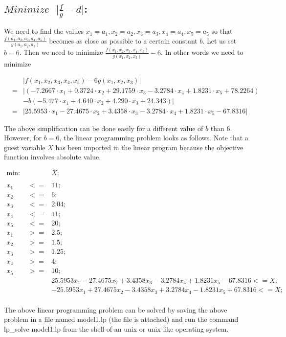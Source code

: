 \documentclass[11pt]{article}
\begin{document}
\subsection{$Minimize \text{ } \vert\frac{f}{g}-d\vert$:} We need to find the values $x_1 = a_1,x_2 = a_2,x_3 = a_3,x_4 = a_4,x_5 = a_5$ so that $\frac{f(a_1,a_2,a_3,a_4,a_5)}{g(a_1,a_2,a_3)}$ becomes as close as possible to a certain constant $b$. Let us set $b=6$. Then we need to minimize $\frac{f(x_1,x_2,x_3,x_4,x_5)}{g(x_1,x_2,x_3)}-6$. In other words we need to minimize 
\begin{tiny}
\begin{eqnarray*}
& & \vert f(x_1,x_2,x_3,x_4,x_5) - 6 g(x_1,x_2,x_3) \vert\\
&=& \vert(-7.2667 \cdot x_1 + 0.3724 \cdot x_2 + 29.1759 \cdot x_3 - 3.2784 \cdot x_4 + 1.8231 \cdot x_5 + 78.2264)\\ 
& & - b(-5.477 \cdot x_1 + 4.640 \cdot x_2 + 4.290 \cdot x_3 + 24.343)\vert \\
&=& \vert 25.5953 \cdot x_1 - 27.4675 \cdot x_2 + 3.4358 \cdot x_3 - 3.2784 \cdot x_4 + 1.8231 \cdot x_5 - 67.8316 \vert
\end{eqnarray*}
\end{tiny}
The above simplification can be done easily for a different value of $b$ than $6$. However, for $b=6$, the linear programming problem looks as follows. Note that a guest variable $X$ has been imported in the linear program because the objective function involves absolute value.
\begin{tiny}
\begin{eqnarray*}
\text{min: } & & X;\\
\\
x_1 &<=& 11;\\
x_2 &<=& 6;\\
x_3 &<=& 2.04;\\
x_4 &<=& 11;\\
x_5 &<=& 20;\\
x_1 &>=& 2.5;\\
x_2 &>=& 1.5;\\
x_3 &>=& 1.25;\\
x_4 &>=& 4;\\
x_5 &>=& 10;\\
&&25.5953 x_1 -  27.4675 x_2 + 3.4358 x_3 - 3.2784 x_4 + 1.8231 x_5 - 67.8316 <= X; \\
&&-25.5953 x_1 +  27.4675 x_2 - 3.4358 x_3 + 3.2784 x_4 - 1.8231 x_5 + 67.8316 <= X; \\
\end{eqnarray*}
\end{tiny}
The above linear programming problem can be solved by saving the above problem in a file named \textsf{model1.lp} (the file is attached) and run the command \textsf{lp\_solve model1.lp} from the shell of an unix or unix like operating system. 
\end{document}
